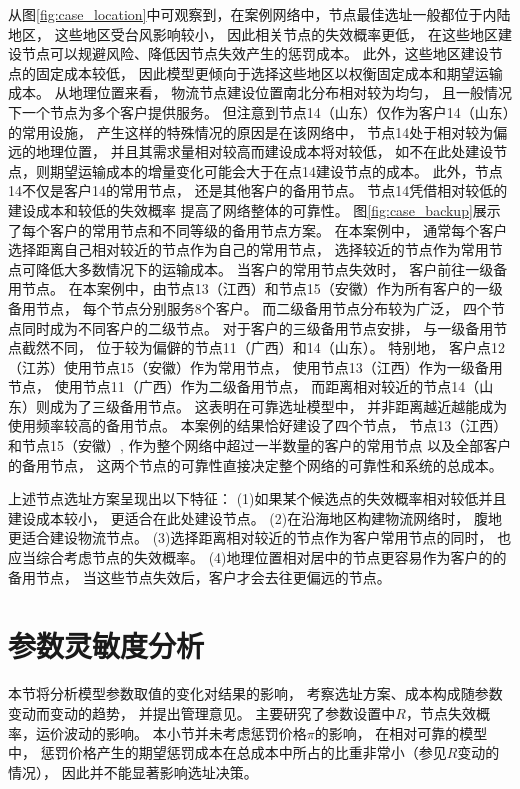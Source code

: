 从图\ref{fig:case_location}中可观察到，在案例网络中，节点最佳选址一般都位于内陆地区，
这些地区受台风影响较小，
因此相关节点的失效概率更低，
在这些地区建设节点可以规避风险、降低因节点失效产生的惩罚成本。
此外，这些地区建设节点的固定成本较低，
因此模型更倾向于选择这些地区以权衡固定成本和期望运输成本。
从地理位置来看，
物流节点建设位置南北分布相对较为均匀，
且一般情况下一个节点为多个客户提供服务。
但注意到节点14（山东）仅作为客户14（山东）的常用设施，
产生这样的特殊情况的原因是在该网络中，
节点14处于相对较为偏远的地理位置，
并且其需求量相对较高而建设成本将对较低，
如不在此处建设节点，则期望运输成本的增量变化可能会大于在点14建设节点的成本。
此外，节点14不仅是客户14的常用节点，
还是其他客户的备用节点。
节点14凭借相对较低的建设成本和较低的失效概率
提高了网络整体的可靠性。
图\ref{fig:case_backup}展示了每个客户的常用节点和不同等级的备用节点方案。
在本案例中，
通常每个客户选择距离自己相对较近的节点作为自己的常用节点，
选择较近的节点作为常用节点可降低大多数情况下的运输成本。
当客户的常用节点失效时，
客户前往一级备用节点。
在本案例中，由节点13（江西）和节点15（安徽）作为所有客户的一级备用节点，
每个节点分别服务8个客户。
而二级备用节点分布较为广泛，
四个节点同时成为不同客户的二级节点。
对于客户的三级备用节点安排，
与一级备用节点截然不同，
位于较为偏僻的节点11（广西）和14（山东）。
特别地，
客户点12（江苏）使用节点15（安徽）作为常用节点，
使用节点13（江西）作为一级备用节点，
使用节点11（广西）作为二级备用节点，
而距离相对较近的节点14（山东）则成为了三级备用节点。
这表明在可靠选址模型中，
并非距离越近越能成为使用频率较高的备用节点。
本案例的结果恰好建设了四个节点，
节点13（江西）和节点15（安徽）,
作为整个网络中超过一半数量的客户的常用节点
以及全部客户的备用节点，
这两个节点的可靠性直接决定整个网络的可靠性和系统的总成本。

上述节点选址方案呈现出以下特征：
(1)如果某个候选点的失效概率相对较低并且建设成本较小，
更适合在此处建设节点。
(2)在沿海地区构建物流网络时，
腹地更适合建设物流节点。
(3)选择距离相对较近的节点作为客户常用节点的同时，
也应当综合考虑节点的失效概率。
(4)地理位置相对居中的节点更容易作为客户的的备用节点，
当这些节点失效后，客户才会去往更偏远的节点。

\section{参数灵敏度分析}
\label{sec:灵敏度}

本节将分析模型参数取值的变化对结果的影响，
考察选址方案、成本构成随参数变动而变动的趋势，
并提出管理意见。
主要研究了参数设置中$R$，节点失效概率，运价波动的影响。
本小节并未考虑惩罚价格$\pi$的影响，
在相对可靠的模型中，
惩罚价格产生的期望惩罚成本在总成本中所占的比重非常小（参见$R$变动的情况），
因此并不能显著影响选址决策。

